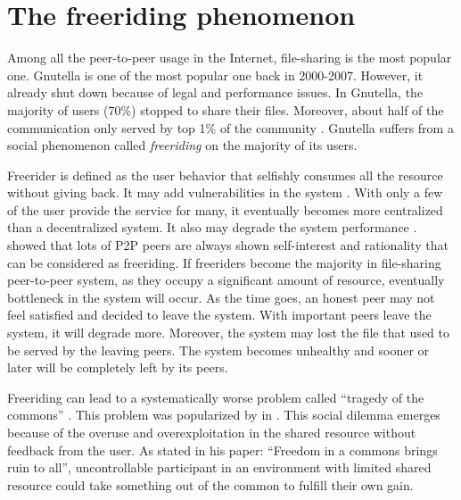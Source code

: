 \section{The freeriding phenomenon}
Among all the peer-to-peer usage in the Internet, file-sharing is the most popular one. Gnutella is one of the most popular one back in 2000-2007. However, it already shut down because of legal and performance issues. In Gnutella, the majority of users (70\%) stopped to share their files. Moreover, about half of the communication only served by top 1\% of the community \cite{2000:freeridegnutella:adar}. Gnutella suffers from a social phenomenon called \textit{freeriding} on the majority of its users.

Freerider is defined as the user behavior that selfishly consumes all the resource without giving back. It may add vulnerabilities in the system \cite{2000:freeridegnutella:adar}. With only a few of the user provide the service for many, it eventually becomes more centralized than a decentralized system. It also may degrade the system performance \cite{2000:freeridegnutella:adar}. \citeauthor{2000:freeridegnutella:adar} showed that lots of P2P peers are always shown self-interest and rationality that can be considered as freeriding. If freeriders become the majority in file-sharing peer-to-peer system, as they occupy a significant amount of resource, eventually bottleneck in the system will occur. As the time goes, an honest peer may not feel satisfied and decided to leave the system. With important peers leave the system, it will degrade more. Moreover, the system may lost the file that used to be served by the leaving peers. The system becomes unhealthy and sooner or later will be completely left by its peers.

Freeriding can lead to a systematically worse problem called ``tragedy of the commons'' \cite{1968:tragedycommon:hardin}. This problem was popularized by \citet*{1968:tragedycommon:hardin} in \citeyear{1968:tragedycommon:hardin}. This social dilemma emerges because of the overuse and overexploitation in the shared resource without feedback from the user. As \citeauthor{1968:tragedycommon:hardin} stated in his paper: ``Freedom in a commons brings ruin to all'', uncontrollable participant in an environment with limited shared resource could take something out of the common to fulfill their own gain.

